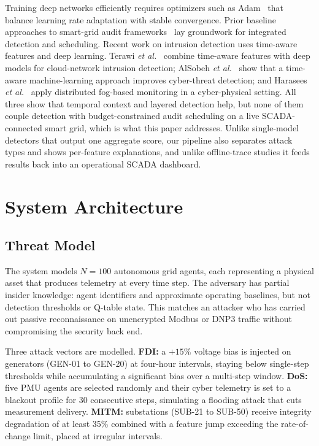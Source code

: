 \documentclass[conference,a4paper]{IEEEtran}
\begin{document}
Training deep networks efficiently requires optimizers such as Adam~\cite{b16} that balance learning rate adaptation with stable convergence. Prior baseline approaches to smart-grid audit frameworks~\cite{b17} lay groundwork for integrated detection and scheduling. Recent work on intrusion detection uses time-aware features and deep learning. Terawi \textit{et al.}~\cite{b18} combine time-aware features with deep models for cloud-network intrusion detection; AlSobeh \textit{et al.}~\cite{b19} show that a time-aware machine-learning approach improves cyber-threat detection; and Harasees \textit{et al.}~\cite{b20} apply distributed fog-based monitoring in a cyber-physical setting. All three show that temporal context and layered detection help, but none of them couple detection with budget-constrained audit scheduling on a live SCADA-connected smart grid, which is what this paper addresses. Unlike single-model detectors that output one aggregate score, our pipeline also separates attack types and shows per-feature explanations, and unlike offline-trace studies it feeds results back into an operational SCADA dashboard.

\section{System Architecture}

\subsection{Threat Model}

The system models $N=100$ autonomous grid agents, each representing a physical asset that produces telemetry at every time step. The adversary has partial insider knowledge: agent identifiers and approximate operating baselines, but not detection thresholds or Q-table state. This matches an attacker who has carried out passive reconnaissance on unencrypted Modbus or DNP3 traffic without compromising the security back end.

Three attack vectors are modelled. \textbf{FDI:} a $+15\%$ voltage bias is injected on generators (GEN-01 to GEN-20) at four-hour intervals, staying below single-step thresholds while accumulating a significant bias over a multi-step window. \textbf{DoS:} five PMU agents are selected randomly and their cyber telemetry is set to a blackout profile for 30 consecutive steps, simulating a flooding attack that cuts measurement delivery. \textbf{MITM:} substations (SUB-21 to SUB-50) receive integrity degradation of at least 35\% combined with a feature jump exceeding the rate-of-change limit, placed at irregular intervals.
\end{document}
